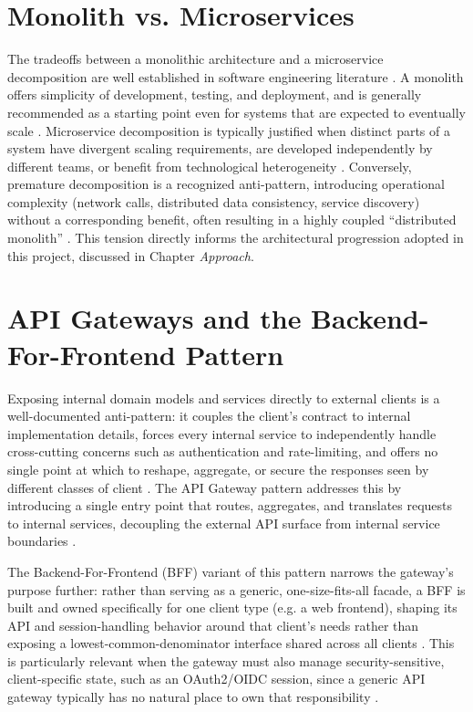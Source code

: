 \documentclass[twoside]{supsistudent}
\begin{document}
\section{Monolith vs. Microservices}
The tradeoffs between a monolithic architecture and a microservice decomposition are well established in software engineering literature \cite{soldani2018pains, jamshidi2018microservices}. A monolith offers simplicity of development, testing, and deployment, and is generally recommended as a starting point even for systems that are expected to eventually scale \cite{fowler2015monolith, newman2015building}. Microservice decomposition is typically justified when distinct parts of a system have divergent scaling requirements, are developed independently by different teams, or benefit from technological heterogeneity \cite{jamshidi2018microservices, schwarz2025balancing}. Conversely, premature decomposition is a recognized anti-pattern, introducing operational complexity (network calls, distributed data consistency, service discovery) without a corresponding benefit, often resulting in a highly coupled ``distributed monolith'' \cite{newman2015building, fowler2015monolith}. This tension directly informs the architectural progression adopted in this project, discussed in Chapter \emph{Approach}.

\section{API Gateways and the Backend-For-Frontend Pattern}
Exposing internal domain models and services directly to external clients is a well-documented anti-pattern: it couples the client's contract to internal implementation details, forces every internal service to independently handle cross-cutting concerns such as authentication and rate-limiting, and offers no single point at which to reshape, aggregate, or secure the responses seen by different classes of client \cite{delaTorre2020dotnet, richardson2018microservices}. The API Gateway pattern addresses this by introducing a single entry point that routes, aggregates, and translates requests to internal services, decoupling the external API surface from internal service boundaries \cite{richardson2018microservices, akbulut2019software}.

The Backend-For-Frontend (BFF) variant of this pattern narrows the gateway's purpose further: rather than serving as a generic, one-size-fits-all facade, a BFF is built and owned specifically for one client type (e.g. a web frontend), shaping its API and session-handling behavior around that client's needs rather than exposing a lowest-common-denominator interface shared across all clients \cite{newman2021building, calcado2015backend, fowler2015backends}. This is particularly relevant when the gateway must also manage security-sensitive, client-specific state, such as an OAuth2/OIDC session, since a generic API gateway typically has no natural place to own that responsibility \cite{rfc10017, rfc9700}.
\end{document}
